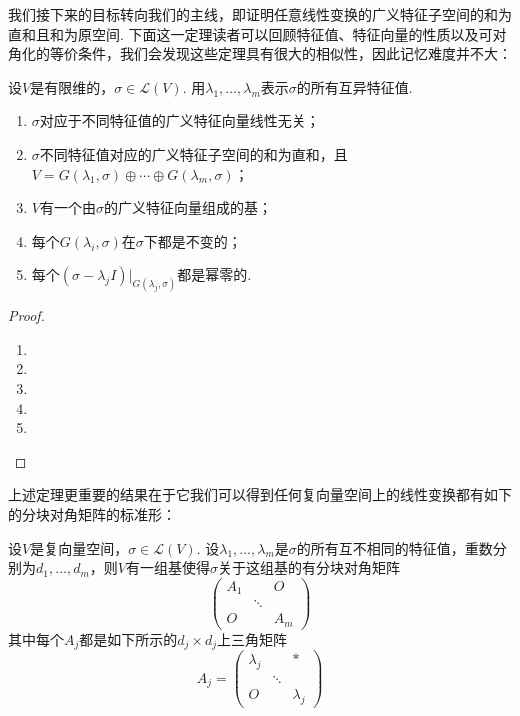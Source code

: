 我们接下来的目标转向我们的主线，即证明任意线性变换的广义特征子空间的和为直和且和为原空间. 下面这一定理读者可以回顾特征值、特征向量的性质以及可对角化的等价条件，我们会发现这些定理具有很大的相似性，因此记忆难度并不大：
\begin{theorem} \label{thm:17:广义特征性质}
    设$V$是有限维的，$\sigma\in \mathcal{L}(V)$. 用$\lambda_1,\ldots,\lambda_m$表示$\sigma$的所有互异特征值.
    \begin{enumerate}[label=(\arabic*)]
        \item $\sigma$对应于不同特征值的广义特征向量线性无关；

        \item \label{item:17:广义特征性质:2}
              $\sigma$不同特征值对应的广义特征子空间的和为直和，且$V=G(\lambda_1,\sigma)\oplus\cdots\oplus
                  G(\lambda_m,\sigma)$；

        \item $V$有一个由$\sigma$的广义特征向量组成的基；

        \item 每个$G(\lambda_i,\sigma)$在$\sigma$下都是不变的；

        \item \label{item:17:广义特征性质:5}
              每个$(\sigma-\lambda_j I)\vert_{G(\lambda_j,\sigma)}$都是幂零的.
    \end{enumerate}
\end{theorem}

\begin{proof}
    \begin{enumerate}
        \item

        \item

        \item

        \item

        \item
    \end{enumerate}
\end{proof}

上述定理更重要的结果在于它我们可以得到任何复向量空间上的线性变换都有如下的分块对角矩阵的标准形：
\begin{theorem} \label{thm:17:分块对角矩阵}
    设$V$是复向量空间，$\sigma\in \mathcal{L}(V)$. 设$\lambda_1,\ldots,\lambda_m$是$\sigma$的所有互不相同的特征值，重数分别为$d_1,\ldots,d_m$，则$V$有一组基使得$\sigma$关于这组基的有分块对角矩阵
    \[\begin{pmatrix}
            A_1 &  & O \\  & \ddots &  \\ O &  & A_m
        \end{pmatrix}\]
    其中每个$A_j$都是如下所示的$d_j\times d_j$上三角矩阵
    \[A_j=\begin{pmatrix}
            \lambda_j &  & * \\  & \ddots &  \\ O &  & \lambda_j
        \end{pmatrix}\]
\end{theorem}

